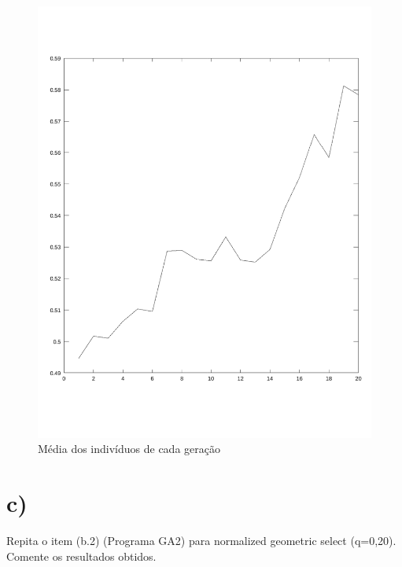 \documentclass{article}
\begin{document}
\newpage
\begin{figure}[h!]
\centering
\includegraphics[scale=.6]{images/mediaDosIndividuosACadaGeracao.pdf}
\caption{Média dos indivíduos de cada geração}
\label{fig:mediaDosIndividuosACadaGeracao}
\end{figure}

\newpage
\section*{c)}

\begin{flushleft}
	Repita o item (b.2) (Programa GA2) para normalized geometric
	select (q=0,20). Comente os resultados obtidos.
\end{flushleft}


\end{document}
